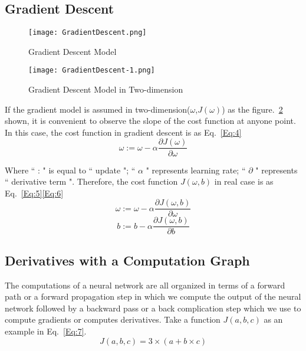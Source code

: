 \documentclass[a4paper]{article}
\begin{document}
\subsection{Gradient Descent}

\begin{figure}[!htp]
\begin{center}
   \texttt{[image: GradientDescent.png]}
\end{center}
   \caption{Gradient Descent Model}
\label{fig:GD}
\end{figure}

\begin{figure}[!htp]
\begin{center}
   \texttt{[image: GradientDescent-1.png]}
\end{center}
   \caption{Gradient Descent Model in Two-dimension}
\label{fig:GD-1}
\end{figure}

If the gradient model is assumed in two-dimension($\omega$,$J(\omega)$) as the figure.~\ref{fig:GD-1} shown, it is convenient to observe the slope of the cost function at anyone point. In this case, the cost function in gradient descent is as Eq.~\ref{Eq:4}
\begin{equation}
\omega:=\omega-\alpha\frac{\partial{J(\omega)}}{\partial \omega}
\label{Eq:4}
\end{equation}\par
Where `` : " is equal to `` update "; `` $\alpha$ " represents learning rate; `` $\partial$ " represents `` derivative term ". Therefore, the cost function $J(\omega,b)$ in real case is as Eq.~\ref{Eq:5}\ref{Eq:6} 
\begin{equation}
\omega:=\omega-\alpha\frac{\partial{J(\omega,b)}}{\partial \omega}
\label{Eq:5}
\end{equation}
\begin{equation}
b:=b-\alpha\frac{\partial{J(\omega,b)}}{\partial b}
\label{Eq:6}
\end{equation}


\subsection{Derivatives with a Computation Graph}
The computations of a  neural network are all organized in terms of a forward path or a forward propagation step in which we compute the output of the neural network followed by a backward pass or a back complication step which we use to compute gradients or computes derivatives. Take a function $J(a,b,c)$ as an example in Eq.~\ref{Eq:7}.
\begin{equation}
J(a,b,c)=3 \times ( a + b \times c )
\label{Eq:7}
\end{equation}
\end{document}
